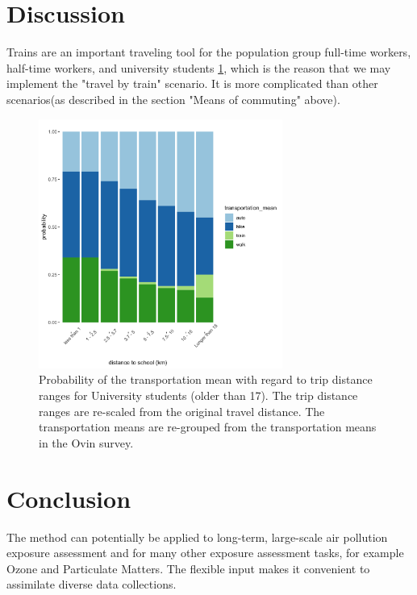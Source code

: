 \documentclass[]{article}
\begin{document}
\section{Discussion}
\label{sec:dis}
Trains are an important traveling tool for the population group full-time workers, half-time workers, and university students \cref{Uni_mode_dist}, which is the reason that we may implement the "travel by train" scenario. It is more complicated than other scenarios(as described in the section "Means of commuting" above). 
\begin{figure}[!h]
    \centering
    \includegraphics[width=8cm]{figure/ditance_vs_transmean_Uni.png}
    \caption{Probability of the transportation mean with regard to trip distance ranges for University students (older than 17). The trip distance ranges are re-scaled from the original travel distance. The transportation means are re-grouped from the transportation means in the Ovin survey.}
    \label{Uni_mode_dist}
\end{figure}

\section{Conclusion}
\label{sec:con}

The method can potentially be applied to long-term, large-scale air pollution exposure assessment and for many other exposure assessment tasks, for example Ozone and Particulate Matters. The flexible input makes it convenient to assimilate diverse data collections.


\newpage


\end{document}
